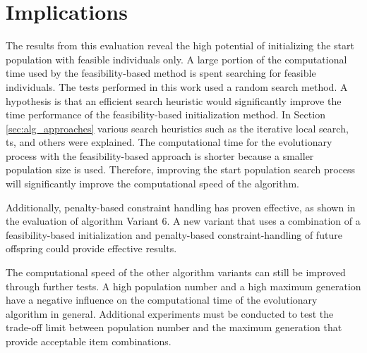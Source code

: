 \section{Implications}
The results from this evaluation reveal the high potential of initializing the start population with feasible individuals only. A large portion of the computational time used by the feasibility-based method is spent searching for feasible individuals. The tests performed in this work used a random search method. A hypothesis is that an efficient search heuristic would significantly improve the time performance of the feasibility-based initialization method. In Section \ref{sec:alg_approaches} various search heuristics such as the iterative local search, \gls{ts}, and others were explained. The computational time for the evolutionary process with the feasibility-based approach is shorter because a smaller population size is used. Therefore, improving the start population search process will significantly improve the computational speed of the algorithm.

Additionally, penalty-based constraint handling has proven effective, as shown in the evaluation of algorithm Variant 6. A new variant that uses a combination of a feasibility-based initialization and penalty-based constraint-handling of future offspring could provide effective results.

The computational speed of the other algorithm variants can still be improved through further tests. A high population number and a high maximum generation have a negative influence on the computational time of the evolutionary algorithm in general. Additional experiments must be conducted to test the trade-off limit between population number and the maximum generation that provide acceptable item combinations.




